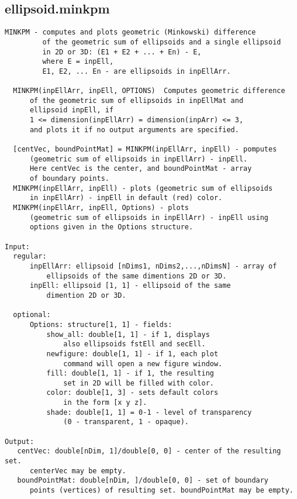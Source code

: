 \subsection{\texorpdfstring{ellipsoid.minkpm}{minkpm}}\label{method:ellipsoid.minkpm}
\begin{verbatim}
MINKPM - computes and plots geometric (Minkowski) difference
         of the geometric sum of ellipsoids and a single ellipsoid
         in 2D or 3D: (E1 + E2 + ... + En) - E,
         where E = inpEll,
         E1, E2, ... En - are ellipsoids in inpEllArr.

  MINKPM(inpEllArr, inpEll, OPTIONS)  Computes geometric difference
      of the geometric sum of ellipsoids in inpEllMat and
      ellipsoid inpEll, if
      1 <= dimension(inpEllArr) = dimension(inpArr) <= 3,
      and plots it if no output arguments are specified.

  [centVec, boundPointMat] = MINKPM(inpEllArr, inpEll) - pomputes
      (geometric sum of ellipsoids in inpEllArr) - inpEll.
      Here centVec is the center, and boundPointMat - array
      of boundary points.
  MINKPM(inpEllArr, inpEll) - plots (geometric sum of ellipsoids
      in inpEllArr) - inpEll in default (red) color.
  MINKPM(inpEllArr, inpEll, Options) - plots
      (geometric sum of ellipsoids in inpEllArr) - inpEll using
      options given in the Options structure.

Input:
  regular:
      inpEllArr: ellipsoid [nDims1, nDims2,...,nDimsN] - array of
          ellipsoids of the same dimentions 2D or 3D.
      inpEll: ellipsoid [1, 1] - ellipsoid of the same
          dimention 2D or 3D.

  optional:
      Options: structure[1, 1] - fields:
          show_all: double[1, 1] - if 1, displays
              also ellipsoids fstEll and secEll.
          newfigure: double[1, 1] - if 1, each plot
              command will open a new figure window.
          fill: double[1, 1] - if 1, the resulting
              set in 2D will be filled with color.
          color: double[1, 3] - sets default colors
              in the form [x y z].
          shade: double[1, 1] = 0-1 - level of transparency
              (0 - transparent, 1 - opaque).

Output:
   centVec: double[nDim, 1]/double[0, 0] - center of the resulting set.
      centerVec may be empty.
   boundPointMat: double[nDim, ]/double[0, 0] - set of boundary
      points (vertices) of resulting set. boundPointMat may be empty.
\end{verbatim}
